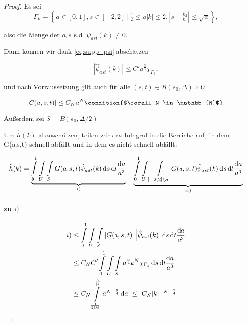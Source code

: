 \begin{proof}
Es sei
\begin{equation*}
    \Gamma_k = \left\{a\in [0,1], s \in [-2,2] ~\Big|~ \tfrac{1}{2} \leq a|k| \leq 2 , \left|s-\tfrac{k_2}{k_1} \right| \leq \sqrt a
                   \right\},
\end{equation*}

also die Menge der $a,s$ s.d. $\psi_{ast}(k) \neq 0$.

Dann können wir dank \cref{eq:supp_psi} abschätzen

\begin{equation*}
    | \hat \psi_{ast} (k)| \leq C' a^{\frac{3}{4}} \chi_{\Gamma_k},
\end{equation*}

und nach Vorraussetzung gilt auch für alle $(s,t) \in B(s_0,\Delta) \times U$

\begin{equation*}
    |G(a,s,t)| \leq C_{N} a^{N}
    \condition{$\forall N \in \mathbb{N}$}.
\end{equation*}

Außerdem sei $S = B(s_0,\Delta/2)$.

Um $\hat h(k)$ abzuschätzen, teilen wir das Integral in die Bereiche auf, in dem G(a,s,t) schnell abfällt und in dem es nicht schnell abfällt:

\begin{dmath*}
    \hat h(k) =
    \underbrace{
    \int \limits_0^1 \int \limits_U \int \limits_{S}
    G(a,s,t) \hat \psi_{ast} (k)
        \d s \d t \frac{\d a}{a^3}}_{i)}
     +
    \underbrace{
     \int \limits_0^1 \int \limits_U \int \limits_{[-2,2]\setminus S}
    G(a,s,t) \hat \psi_{ast} (k)
        \d s \d t \frac{\d a}{a^3}}_{ii)}
\end{dmath*}



\paragraph{zu $i)$}
\begin{align*}
    i) &\leq
     \int \limits_0^1 \int \limits_U \int \limits_{S}
    \left\lvert G(a,s,t)\right\rvert
    \left\lvert \hat \psi_{ast} (k) \right\rvert
        \mathop{}\!\mathrm{d} s \mathop{}\!\mathrm{d} t \frac{\mathop{}\!\mathrm{d} a}{a^3}
    \\ &\leq
    C_N C'
    \int \limits_0^1 \int \limits_U \int \limits_{S}
    a^{\frac{3}{4}} a^N \chi_{\Gamma_k} \mathop{}\!\mathrm{d} s \mathop{}\!\mathrm{d} t \frac{\mathop{}\!\mathrm{d} a}{a^3}
    \\ &\leq
    C_N \int \limits_{\frac{1}{2|k|}}^{\frac{2}{|k|}}
    a^{N-\frac{9}{4}} \mathop{}\!\mathrm{d} a
    ~\leq~
     C_N |k|^{-N+\frac{7}{4}}
\end{align*}


\end{proof}
